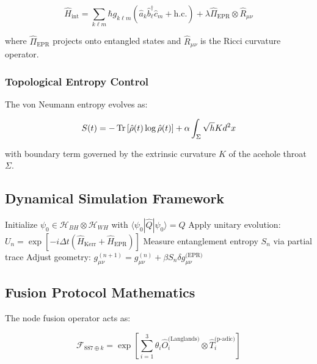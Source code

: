 \documentclass[12pt]{article}
\begin{document}
\begin{equation}
\hat{H}_{\text{int}} = \sum_{k\ell m}\hbar g_{k\ell m}\left(\hat{a}_k\hat{b}_\ell^\dagger\hat{c}_m + \text{h.c.}\right) + \lambda\hat{\Pi}_{\text{EPR}}\otimes\hat{R}_{\mu\nu}
\end{equation}

where $\hat{\Pi}_{\text{EPR}}$ projects onto entangled states and $\hat{R}_{\mu\nu}$ is the Ricci curvature operator.

\subsubsection{Topological Entropy Control}
The von Neumann entropy evolves as:

\begin{equation}
S(t) = -\Tr\left[\hat{\rho}(t)\log\hat{\rho}(t)\right] + \alpha\int_\Sigma \sqrt{h}K d^2x
\end{equation}

with boundary term governed by the extrinsic curvature $K$ of the acehole throat $\Sigma$.

\subsection{Dynamical Simulation Framework}

\begin{algorithm}[H]
\caption{Kerr-Newman-Wormhole Hybrid Dynamics}
\begin{algorithmic}[1]
\STATE Initialize $\psi_0 \in \mathcal{H}_{BH}\otimes\mathcal{H}_{WH}$ with $\langle \psi_0|\hat{Q}|\psi_0\rangle = Q$
\STATE Apply unitary evolution: $U_n = \exp\left[-i\Delta t(\hat{H}_{\text{Kerr}} + \hat{H}_{\text{EPR}})\right]$
\STATE Measure entanglement entropy $S_n$ via partial trace
\STATE Adjust geometry: $g_{\mu\nu}^{(n+1)} = g_{\mu\nu}^{(n)} + \beta S_n \delta g_{\mu\nu}^{\text{(EPR)}}$
\ENDFOR
\end{algorithmic}
\end{algorithm}

\subsection{Fusion Protocol Mathematics}
The node fusion operator acts as:

\begin{equation}
\mathcal{F}_{887\oplus k} = \exp\left[\sum_{i=1}^3 \theta_i \hat{O}_i^{\text{(Langlands)}}\otimes \hat{T}_i^{\text{(p-adic)}}\right]
\end{equation}
\end{document}
